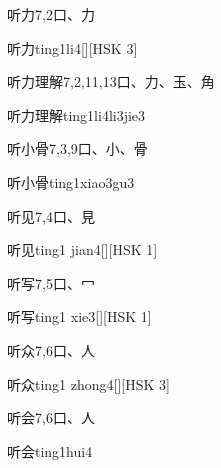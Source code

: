 \begin{entry}{听力}{7,2}{⼝、⼒}
  \begin{phonetics}{听力}{ting1li4}[][HSK 3]
  \end{phonetics}
\end{entry}

\begin{entry}{听力理解}{7,2,11,13}{⼝、⼒、⽟、⾓}
  \begin{phonetics}{听力理解}{ting1li4li3jie3}
  \end{phonetics}
\end{entry}

\begin{entry}{听小骨}{7,3,9}{⼝、⼩、⾻}
  \begin{phonetics}{听小骨}{ting1xiao3gu3}
  \end{phonetics}
\end{entry}

\begin{entry}{听见}{7,4}{⼝、⾒}
  \begin{phonetics}{听见}{ting1 jian4}[][HSK 1]
  \end{phonetics}
\end{entry}

\begin{entry}{听写}{7,5}{⼝、⼍}
  \begin{phonetics}{听写}{ting1 xie3}[][HSK 1]
  \end{phonetics}
\end{entry}

\begin{entry}{听众}{7,6}{⼝、⼈}
  \begin{phonetics}{听众}{ting1 zhong4}[][HSK 3]
  \end{phonetics}
\end{entry}

\begin{entry}{听会}{7,6}{⼝、⼈}
  \begin{phonetics}{听会}{ting1hui4}
  \end{phonetics}
\end{entry}

